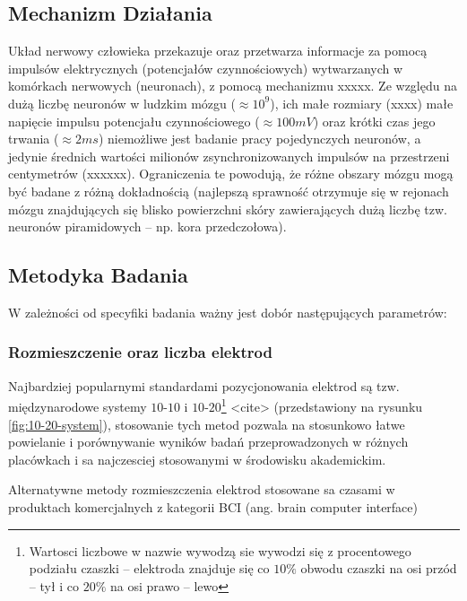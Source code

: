 \documentclass{./assets/wfis}
\begin{document}
\subsection{Mechanizm Działania}
Układ nerwowy człowieka przekazuje oraz przetwarza informacje za pomocą impulsów elektrycznych (potencjałów czynnościowych) wytwarzanych w komórkach nerwowych (neuronach), z pomocą mechanizmu xxxxx. Ze względu na dużą liczbę neuronów w ludzkim mózgu ($\approx10^9$\cite{herculano-houzel_human_2009}), ich małe rozmiary (xxxx) małe napięcie impulsu potencjału czynnościowego ($\approx100mV$\cite{biga_anatomy_2019}) oraz krótki czas jego trwania ($\approx2ms$\cite{biga_anatomy_2019}) niemożliwe jest badanie pracy pojedynczych neuronów, a jedynie średnich wartości milionów zsynchronizowanych impulsów na przestrzeni centymetrów (xxxxxx). Ograniczenia te powodują, że różne obszary mózgu mogą być badane z różną dokładnością (najlepszą sprawność otrzymuje się w rejonach mózgu znajdujących się blisko powierzchni skóry zawierających dużą liczbę tzw. neuronów piramidowych – np. kora przedczołowa).

\subsection{Metodyka Badania}
W zależności od specyfiki badania ważny jest dobór następujących parametrów:

\subsubsection{Rozmieszczenie oraz liczba elektrod}
Najbardziej popularnymi standardami pozycjonowania elektrod są tzw. międzynarodowe systemy $10$-$10$ i $10$-$20$\footnote{Wartosci liczbowe w nazwie wywodzą sie wywodzi się z procentowego podziału czaszki – elektroda znajduje się co $10\%$ obwodu czaszki na osi przód – tył i co $20\%$ na osi prawo – lewo} <cite> (przedstawiony na rysunku \ref{fig:10-20-system}), stosowanie tych metod pozwala na stosunkowo łatwe powielanie i porównywanie wyników badań przeprowadzonych w różnych placówkach i sa najczesciej stosowanymi w środowisku akademickim. 

Alternatywne metody rozmieszczenia elektrod stosowane sa czasami w produktach komercjalnych z kategorii BCI (ang. brain computer interface) 
\end{document}
